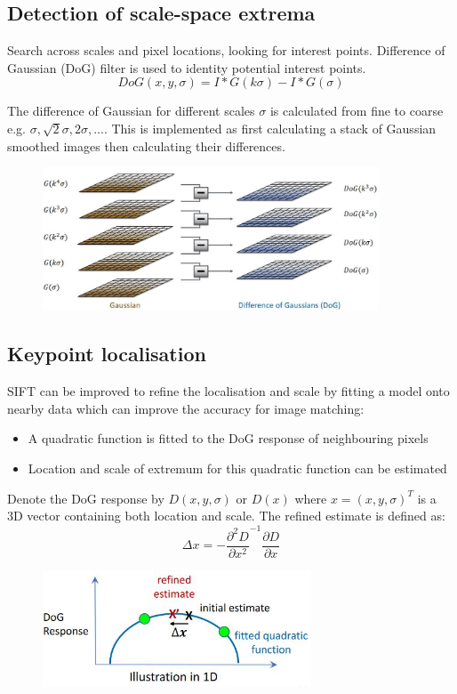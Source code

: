 \documentclass{report}
\begin{document}
\subsection{Detection of scale-space extrema}

Search across scales and pixel locations, looking for interest points.
Difference of Gaussian (DoG) filter is used to identity potential interest
points.
$$
    DoG(x,y,\sigma) = I * G(k \sigma) - I * G(\sigma)
$$

The difference of Gaussian for different scales $\sigma$ is calculated from fine
to coarse e.g. $\sigma, \sqrt{2}\sigma, 2\sigma, ...$. This is implemented as
first calculating a stack of Gaussian smoothed images then calculating their
differences.
\begin{figure}[h]
    \centering
    \includegraphics[width=10cm]{G to DoG.JPG}
\end{figure}

\subsection{Keypoint localisation}

SIFT can be improved to refine the localisation and scale by fitting a model
onto nearby data which can improve the accuracy for image matching:
\begin{itemize}
    \item A quadratic function is fitted to the DoG response of neighbouring pixels  
    \item Location and scale of extremum for this quadratic function can be
    estimated 
\end{itemize}

Denote the DoG response by $D(x,y,\sigma)$ or $D(x)$ where $x = (x,y,\sigma)^T$
is a 3D vector containing both location and scale. The refined estimate is
defined as: 
$$
    \Delta x = - \frac{\partial^2 D}{\partial x^2}^{-1} \frac{\partial D}{\partial x} 
$$
\begin{figure}[h]
    \centering
    \includegraphics[width=8cm]{Keypoint.JPG}
\end{figure}
\end{document}
